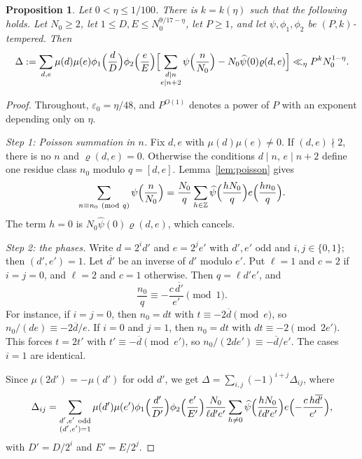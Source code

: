 \documentclass[11pt]{amsart}
\newtheorem{proposition}[theorem]{Proposition}
\theoremstyle{definition}
\theoremstyle{remark}
\numberwithin{equation}{section}
\newcommand{\Z}{\mathbb Z}
\newcommand{\eps}{\varepsilon}
\newcommand{\inv}[1]{\overline{#1}}
\begin{document}
\begin{proposition}\label{prop:smooth-level}
Let $0<\eta\le1/100$.  There is $k=k(\eta)$ such that the following holds.
Let $N_0\ge2$, let $1\le D,E\le N_0^{9/17-\eta}$, let $P\ge1$, and let
$\psi,\phi_1,\phi_2$ be $(P,k)$-tempered.  Then
\[
 \Delta:=\sum_{d,e}\mu(d)\mu(e)\phi_1\Bigl(\frac dD\Bigr)\phi_2\Bigl(\frac eE\Bigr)
 \Bigl[\sum_{\substack{d\mid n\\ e\mid n+2}}\psi\Bigl(\frac n{N_0}\Bigr)
 -N_0\widehat\psi(0)\varrho(d,e)\Bigr]
 \ll_\eta P^{k}N_0^{1-\eta}.
\]
\end{proposition}

\begin{proof}
Throughout, $\eps_0=\eta/48$, and $P^{O(1)}$ denotes a power of $P$ with an
exponent depending only on $\eta$.

\emph{Step 1: Poisson summation in $n$.}  Fix $d,e$ with
$\mu(d)\mu(e)\ne0$.  If $(d,e)\nmid2$, there is no $n$ and
$\varrho(d,e)=0$.  Otherwise the conditions $d\mid n$, $e\mid n+2$ define
one residue class $n_0$ modulo $q=[d,e]$.  Lemma~\ref{lem:poisson} gives
\[
 \sum_{n\equiv n_0\ (\mathrm{mod}\ q)}\psi\Bigl(\frac n{N_0}\Bigr)
 =\frac{N_0}q\sum_{h\in\Z}\widehat\psi\Bigl(\frac{hN_0}q\Bigr)
 e\Bigl(\frac{hn_0}q\Bigr).
\]
The term $h=0$ is $N_0\widehat\psi(0)\varrho(d,e)$, which cancels.

\emph{Step 2: the phases.}  Write $d=2^id'$ and $e=2^je'$ with $d',e'$ odd
and $i,j\in\{0,1\}$; then $(d',e')=1$.  Let $\inv{d'}$ be an inverse of $d'$
modulo $e'$.  Put $\ell=1$ and $c=2$ if $i=j=0$, and $\ell=2$ and $c=1$
otherwise.  Then $q=\ell d'e'$, and
\begin{equation}\label{eq:pair-phase}
 \frac{n_0}q\equiv-\frac{c\,\inv{d'}}{e'}\pmod 1 .
\end{equation}
For instance, if $i=j=0$, then $n_0=dt$ with $t\equiv-2\inv d\pmod e$, so
$n_0/(de)\equiv-2\inv d/e$.  If $i=0$ and $j=1$, then $n_0=dt$ with
$dt\equiv-2\pmod{2e'}$.  This forces $t=2t'$ with $t'\equiv-\inv d\pmod{e'}$,
so $n_0/(2de')\equiv-\inv d/e'$.  The cases $i=1$ are identical.

Since $\mu(2d')=-\mu(d')$ for odd $d'$, we get
$\Delta=\sum_{i,j}(-1)^{i+j}\Delta_{ij}$, where
\[
 \Delta_{ij}=\sum_{\substack{d',e'\ \mathrm{odd}\\(d',e')=1}}
 \mu(d')\mu(e')\phi_1\Bigl(\frac{d'}{D'}\Bigr)\phi_2\Bigl(\frac{e'}{E'}\Bigr)
 \frac{N_0}{\ell d'e'}\sum_{h\neq0}
 \widehat\psi\Bigl(\frac{hN_0}{\ell d'e'}\Bigr)
 e\Bigl(-\frac{c\,h\inv{d'}}{e'}\Bigr),
\]
with $D'=D/2^i$ and $E'=E/2^j$.


\end{proof}
\end{document}

